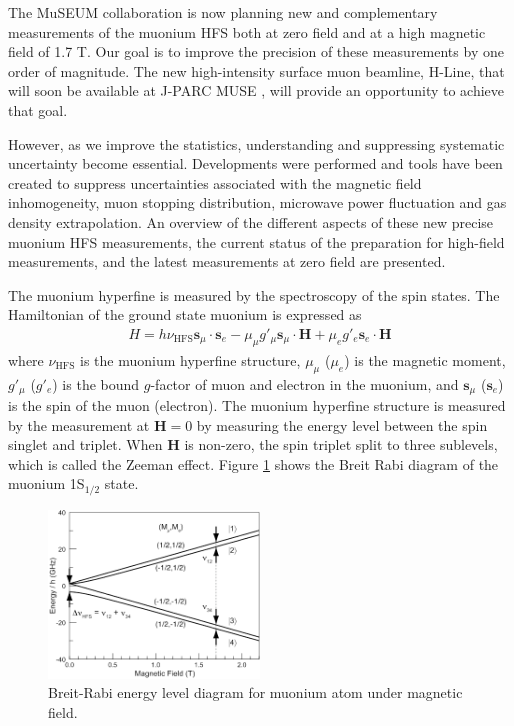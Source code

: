 The MuSEUM collaboration is now planning new and complementary
measurements of the muonium HFS both at zero field and at a high
magnetic field of 1.7 T.  Our goal is to improve the precision
of these measurements by one order of magnitude.  The new
high-intensity surface muon beamline, H-Line, that will soon be
available at J-PARC MUSE \cite{Higemoto-etal}, will provide
an opportunity to achieve that goal.

However, as we improve the statistics, understanding and suppressing
systematic uncertainty become essential.  Developments were performed
and tools have been created to suppress uncertainties associated
with the magnetic field inhomogeneity, muon stopping distribution,
microwave power fluctuation and gas density extrapolation.  An
overview of the different aspects of these new precise muonium
HFS measurements, the current status of the preparation for
high-field measurements, and the latest measurements at zero
field are presented.


The muonium hyperfine is measured by the spectroscopy of the
spin states.  The Hamiltonian of the ground state muonium is
expressed as
%
\begin{align}
 H  =    h \nu_{\text{HFS}} \mathbf{s}_\mu \cdot \mathbf{s}_e
      - \mu_\mu g'_\mu \mathbf{s}_\mu \cdot \mathbf{H} 
      + \mu_e g'_e \mathbf{s}_e \cdot \mathbf{H} 
\end{align}
%
where $\nu_{\text{HFS}}$ is the muonium hyperfine structure,
$\mu_\mu$ ($\mu_e$) is the magnetic moment, $g'_\mu$ ($g'_e$)
is the bound $g$-factor of muon and electron in the muonium,
and $\mathbf{s}_\mu$ ($\mathbf{s}_e$) is the spin of the muon
(electron).  The muonium hyperfine structure is measured by
the measurement at $\mathbf{H}=0$ by measuring the energy level
between the spin singlet and triplet.  When $\mathbf{H}$
is non-zero, the spin triplet split to three sublevels, which
is called the Zeeman effect.  Figure \ref{fig:BreitRabi} shows
the Breit Rabi diagram of the muonium 1S$_{1/2}$ state.

\begin{figure}[th]
 \centering
 \includegraphics[width=0.5\textwidth, bb= 0 0 227 181]
                 {./Fig/MuHFS-BreitRabi.png}
\caption{\label{fig:BreitRabi}
Breit-Rabi energy level diagram for muonium atom under magnetic field.}
\end{figure}

